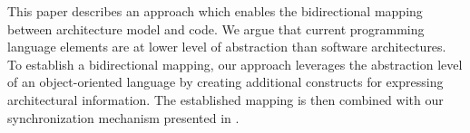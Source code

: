 This paper describes an approach which enables the bidirectional mapping between architecture model and code. %
We argue that current programming language elements are at lower level of abstraction than software architectures.
To establish a bidirectional mapping, our approach leverages the abstraction level of an object-oriented language by creating additional constructs for expressing architectural information.
The established mapping is then combined with our synchronization mechanism presented in \cite{foster2016}.





